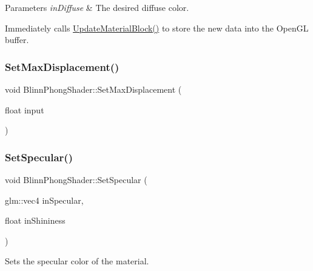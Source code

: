 \begin{DoxyParams}{Parameters}
{\em in\+Diffuse} & The desired diffuse color.\\
\hline
\end{DoxyParams}
Immediately calls \hyperlink{class_blinn_phong_shader_aa247270120b46431b436220ea6e777be}{Update\+Material\+Block()} to store the new data into the Open\+GL buffer. \hypertarget{class_blinn_phong_shader_acbef23fe1f5ea72a10dc6ded656dacf0}{}\label{class_blinn_phong_shader_acbef23fe1f5ea72a10dc6ded656dacf0}
\subsubsection{\texorpdfstring{Set\+Max\+Displacement()}{SetMaxDisplacement()}}
{\footnotesize\ttfamily void Blinn\+Phong\+Shader\+::\+Set\+Max\+Displacement (\begin{DoxyParamCaption}\item[{float}]{input }\end{DoxyParamCaption})\hspace{0.3cm}{\ttfamily [virtual]}}

\hypertarget{class_blinn_phong_shader_a6567423da36050cc1567919707e8be72}{}\label{class_blinn_phong_shader_a6567423da36050cc1567919707e8be72}
\subsubsection{\texorpdfstring{Set\+Specular()}{SetSpecular()}}
{\footnotesize\ttfamily void Blinn\+Phong\+Shader\+::\+Set\+Specular (\begin{DoxyParamCaption}\item[{glm\+::vec4}]{in\+Specular,  }\item[{float}]{in\+Shininess }\end{DoxyParamCaption})\hspace{0.3cm}{\ttfamily [virtual]}}



Sets the specular color of the material.


